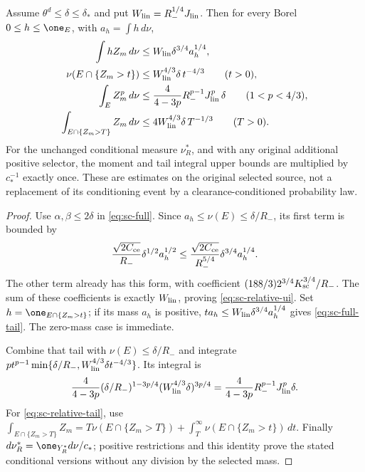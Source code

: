 \begin{corollary}
\label{cor:sc-linear-moments}
Assume $\theta^d\le\delta\le\delta_*$ and put
$W_{\rm lin}=R_-^{1/4}J_{\rm lin}$.  Then for every Borel
$0\le h\le\one_E$, with $a_h=\int h\,d\nu$,
\begin{align}
 \int hZ_m\,d\nu
      &\le W_{\rm lin}\delta^{3/4}a_h^{1/4},
                                             \label{eq:sc-relative-ui}\\
 \nu(E\cap\{Z_m>t\})
      &\le W_{\rm lin}^{4/3}\delta\,t^{-4/3}
                         \qquad(t>0),          \label{eq:sc-full-tail}\\
 \int_E Z_m^p\,d\nu
      &\le\frac4{4-3p}R_-^{p-1}J_{\rm lin}^p\,\delta
                         \qquad(1<p<4/3),     \label{eq:sc-linear-moments}\\
 \int_{E\cap\{Z_m>T\}}Z_m\,d\nu
      &\le4W_{\rm lin}^{4/3}\delta\,T^{-1/3}
                         \qquad(T>0).          \label{eq:sc-relative-tail}
\end{align}
For the unchanged conditional measure $\nu_R^*$, and with any
original additional positive selector, the moment and tail integral
upper bounds are multiplied by $c_*^{-1}$ exactly once.  These are
estimates on the original selected source, not a replacement of its
conditioning event by a clearance-conditioned probability law.
\end{corollary}
\begin{proof}
Use $\alpha,\beta\le2\delta$ in \eqref{eq:sc-full}.
Since $a_h\le\nu(E)\le\delta/R_-$, its first term is bounded by
\[
 \frac{\sqrt{2C_{\rm ce}}}{R_-}
       \delta^{1/2}a_h^{1/2}
 \le\frac{\sqrt{2C_{\rm ce}}}{R_-^{5/4}}
       \delta^{3/4}a_h^{1/4}.
\]
The other term already has this form, with coefficient
$(188/3)2^{3/4}K_{\rm sc}^{3/4}/R_-$.  The sum of these
coefficients is exactly $W_{\rm lin}$, proving
\eqref{eq:sc-relative-ui}.  Set
$h=\one_{E\cap\{Z_m>t\}}$; if its mass $a_h$ is positive,
$ta_h\le W_{\rm lin}\delta^{3/4}a_h^{1/4}$ gives
\eqref{eq:sc-full-tail}.  The zero-mass case is immediate.

Combine that tail with $\nu(E)\le\delta/R_-$ and integrate
$p t^{p-1}\min\{\delta/R_-,W_{\rm lin}^{4/3}\delta t^{-4/3}\}$.
Its integral is
\[
 \frac4{4-3p}
       (\delta/R_-)^{1-3p/4}
       (W_{\rm lin}^{4/3}\delta)^{3p/4}
 =\frac4{4-3p}R_-^{p-1}J_{\rm lin}^p\delta.
\]
For \eqref{eq:sc-relative-tail}, use
$\int_{E\cap\{Z_m>T\}}Z_m
 =T\nu(E\cap\{Z_m>T\})+\int_T^\infty\nu(E\cap\{Z_m>t\})\,dt$.
Finally $d\nu_R^*=\one_{Y_R^*}d\nu/c_*$; positive restrictions
and this identity prove the stated conditional versions without any
division by the selected mass.
\end{proof}

